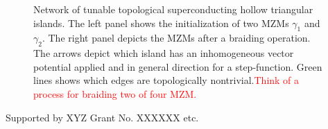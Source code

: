 \documentclass[aps,prb,showpacs,amsmath,twocolumn,amssymb,superscriptaddress]{revtex4-2}
\newcommand{\Red}[1]{\textcolor{red}{#1}}
\begin{document}
\begin{figure}[]
  \caption{Network of tunable topological superconducting hollow triangular islands. The left panel shows the initialization of two MZMs $\gamma_1$ and $\gamma_2$. The right panel depicts the MZMs after a braiding operation. The arrows depict which island has an inhomogeneous vector potential applied and in general direction for a step-function. Green lines shows which edges are topologically nontrivial.\Red{Think of a process for braiding two of four MZM.}}
  \label{fig: triangular-network-braiding}
\end{figure}

\begin{acknowledgements}
  Supported by XYZ Grant No. XXXXXX etc.
\end{acknowledgements}



\end{document}

